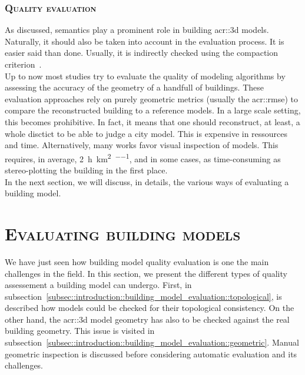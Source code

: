         \subsubsection{\textsc{Quality evaluation}}
            As discussed, semantics play a prominent role in building \gls{acr::3d} models.
            Naturally, it should also be taken into account in the evaluation process.
            It is easier said than done.
            Usually, it is indirectly checked using the compaction criterion~\parencite{lafarge2012creating}.\\
            Up to now most studies try to evaluate the quality of modeling algorithms by assessing the accuracy of the geometry of a handfull of buildings.
            These evaluation approaches rely on purely geometric metrics (usually the \gls{acr::rmse}) to compare the reconstructed building to a reference models.
            In a large scale setting, this becomes prohibitive.
            In fact, it means that one should reconstruct, at least, a whole disctict to be able to judge a city model.
            This is expensive in ressources and time.
            Alternatively, many works favor visual inspection of models.
            This requires, in average, \SI[per-mode=repeated-symbol]{2}{\hour\per\km\squared\per\expert}, and in some cases, as time-consuming  as stereo-plotting the building in the first place.\\
            In the next section, we will discuss, in details, the various ways of evaluating a building model.

\section{\textsc{Evaluating building models}}
    \label{sec::introduction::building_model_evaluation}
    We have just seen how building model quality evaluation is one the main challenges in the field.
    In this section, we present the different types of quality assessement a building model can undergo.
    First, in subsection~\ref{subsec::introduction::building_model_evaluation::topological}, is described how models could be checked for their topological consistency.
    On the other hand, the \gls{acr::3d} model geometry has also to be checked against the real building geometry.
    This issue is visited in subsection~\ref{subsec::introduction::building_model_evaluation::geometric}.
    Manual geometric inspection is discussed before considering automatic evaluation and its challenges.

